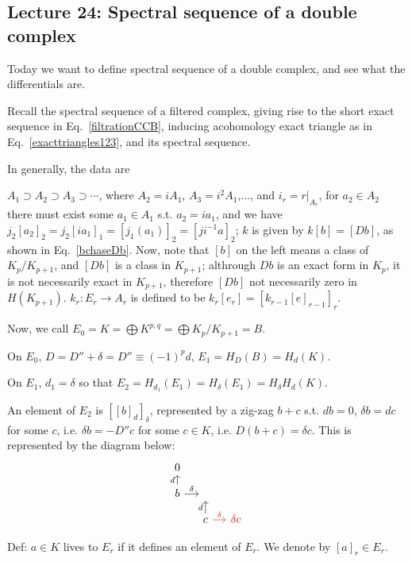 \documentclass{article}
\theoremstyle{mystyle}
\theoremstyle{remark}
\numberwithin{equation}{section}
\begin{document}
\subsection{Lecture 24: Spectral sequence of a double complex}

Today we want to define spectral sequence of a double complex, and see what the differentials are.

Recall the spectral sequence of a filtered complex, giving rise to the short exact sequence in Eq.~\eqref{filtrationCCB}, inducing acohomology exact triangle as in Eq.~\eqref{exacttriangles123}, and its spectral sequence.

In generally, the data are

$A_1\supset A_2\supset A_3\supset \cdots$, where $A_2 = iA_1$, $A_3 = i^2A_1$,..., and $i_r = r|_{A_r}$, for $a_2 \in A_2$ there must exist some $a_1 \in A_1$ s.t. $a_2 = ia_1$, and we have $j_2[a_2]_2 = j_2[ia_1]_1 = [j_1(a_1)]_2 = [ji^{-1}a]_2$; $k$ is given by $k[b] = [Db]$, as shown in Eq.~\eqref{bchaseDb}. Now, note that $[b]$ on the left means a class of $K_p/K_{p+1}$, and $[Db]$ is a class in $K_{p+1}$; althrough $Db$ is an exact form in $K_p$, it is not necessarily exact in $K_{p+1}$, therefore $[Db]$ not necessarily zero in $H(K_{p+1})$. $k_r\colon E_r\rightarrow A_r$ is defined to be $k_r[e_r] = [k_{r-1}[e]_{r-1}]_r$.






Now, we call $E_0 = K = \bigoplus K^{p,q} = \bigoplus K_p/K_{p+1} = B$.  

On $E_0$, $D = D''+\delta = D''\equiv(-1)^pd$, $E_1 = H_D(B) = H_d(K)$. 

On $E_1$, $d_1=\delta$ so that $E_2 = H_{d_1}(E_1) = H_\delta(E_1) = H_\delta H_d(K)$. 

An element of $E_2$ is $[[b]_d]_\delta$, represented by a zig-zag $b+c$ s.t. $db=0$, $\delta b = dc$ for some $c$, i.e. $\delta b = -D''c$ for some $c\in K$, i.e. $D(b+c) = \delta c$. This is represented by the diagram below:
$$
\begin{tikzcd}[column sep = small, row sep = small] 0&&\\b\ar[u,"d"]\ar[r,"\delta"]&~&\\&c\ar[u,"d"]\ar[r,red,"\delta"]&\color{red}{\delta c}
\end{tikzcd}
$$


Def: $a\in K$ lives to $E_r$ if it defines an element of $E_r$. We denote by $[a]_r\in E_r$. 
\end{document}
